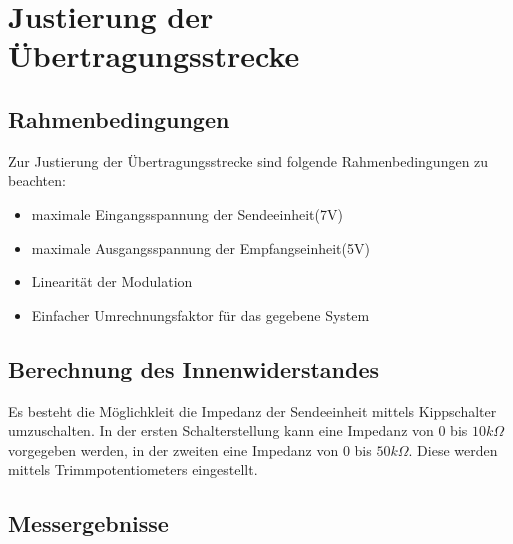 \section{Justierung der Übertragungsstrecke}
\subsection{Rahmenbedingungen}
Zur Justierung der Übertragungsstrecke sind folgende Rahmenbedingungen zu beachten:
\begin{itemize}
\item maximale Eingangsspannung der Sendeeinheit(7V)
\item maximale Ausgangsspannung der Empfangseinheit(5V)
\item Linearität der Modulation
\item Einfacher Umrechnungsfaktor für das gegebene System
\end{itemize}

\subsection{Berechnung des Innenwiderstandes}
Es besteht die Möglichkleit die Impedanz der Sendeeinheit mittels Kippschalter umzuschalten. In der ersten Schalterstellung kann eine Impedanz von 0 bis $10k\Omega$ vorgegeben werden, in der zweiten eine Impedanz von 0 bis $50k\Omega$. Diese werden mittels Trimmpotentiometers eingestellt. 
\subsection{Messergebnisse}
  	\begin{figure}[H]
		
		
		\end{figure}
		\begin{figure}[H]
	
	\end{figure}
	\begin{figure}[H]
		
		\end{figure}
		\begin{figure}[H]
	
	\end{figure}
 